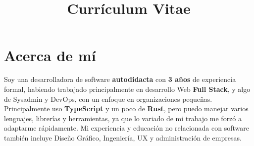 \documentclass[11pt,a4paper,sans]{moderncv}
\title{Currículum Vitae}
\begin{document}
\setsansfont{Helvetica Neue LT Std 47 Light Condensed}
\setmonofont{Fira Code}


\makecvtitle %


\section{Acerca de mí}

 { \flushleft Soy una desarrolladora de software \textbf{autodidacta} con \textbf{3 años} de experiencia formal, habiendo trabajado principalmente en desarrollo Web \textbf{Full Stack}, y algo de Sysadmin y DevOps, con un enfoque en organizaciones pequeñas. Principalmente uso \textbf{TypeScript} y un poco de \textbf{Rust}, pero puedo manejar varios lenguajes, librerías y herramientas, ya que lo variado de mi trabajo me forzó a adaptarme rápidamente. Mi experiencia y educación no relacionada con software también incluye Diseño Gráfico, Ingeniería, UX y administración de empresas.

 }

\end{document}
